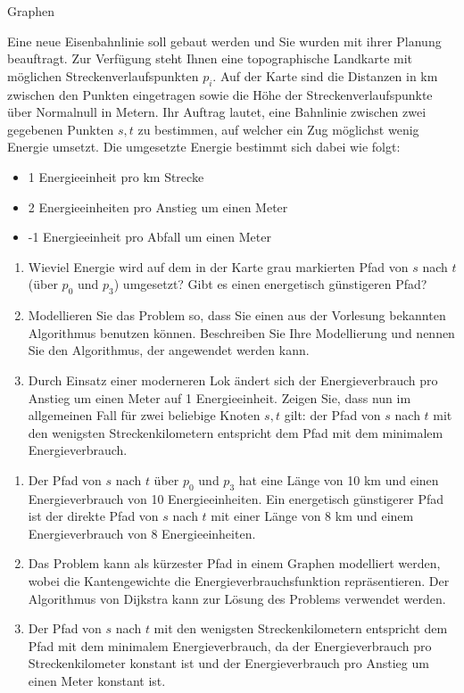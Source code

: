 \documentclass{article}
\begin{document}
\begin{exercise}{Graphen}
  
  Eine neue Eisenbahnlinie soll gebaut werden und Sie wurden mit ihrer Planung beauftragt. Zur Verfügung steht Ihnen eine topographische Landkarte mit möglichen Streckenverlaufspunkten $p_i$. Auf der Karte sind die Distanzen in km zwischen den Punkten eingetragen sowie die Höhe der Streckenverlaufspunkte über Normalnull in Metern. Ihr Auftrag lautet, eine Bahnlinie zwischen zwei gegebenen Punkten $s, t$ zu bestimmen, auf welcher ein Zug möglichst wenig Energie umsetzt. Die umgesetzte Energie bestimmt sich dabei wie folgt:
  \begin{itemize}
    \item 1 Energieeinheit pro km Strecke
    \item 2 Energieeinheiten pro Anstieg um einen Meter
    \item -1 Energieeinheit pro Abfall um einen Meter
  \end{itemize}
  \begin{enumerate}
    \item Wieviel Energie wird auf dem in der Karte grau markierten Pfad von $s$ nach $t$ (über $p_0$ und $p_3$) umgesetzt? Gibt es einen energetisch günstigeren Pfad?
    \item Modellieren Sie das Problem so, dass Sie einen aus der Vorlesung bekannten Algorithmus benutzen können. Beschreiben Sie Ihre Modellierung und nennen Sie den Algorithmus, der angewendet werden kann.
    \item Durch Einsatz einer moderneren Lok ändert sich der Energieverbrauch pro Anstieg um einen Meter auf 1 Energieeinheit. Zeigen Sie, dass nun im allgemeinen Fall für zwei beliebige Knoten $s, t$ gilt: der Pfad von $s$ nach $t$ mit den wenigsten Streckenkilometern entspricht dem Pfad mit dem minimalem Energieverbrauch.
  \end{enumerate}

  \begin{solution}
    \begin{enumerate}
      \item Der Pfad von $s$ nach $t$ über $p_0$ und $p_3$ hat eine Länge von 10 km und einen Energieverbrauch von 10 Energieeinheiten. Ein energetisch günstigerer Pfad ist der direkte Pfad von $s$ nach $t$ mit einer Länge von 8 km und einem Energieverbrauch von 8 Energieeinheiten.
      \item Das Problem kann als kürzester Pfad in einem Graphen modelliert werden, wobei die Kantengewichte die Energieverbrauchsfunktion repräsentieren. Der Algorithmus von Dijkstra kann zur Lösung des Problems verwendet werden.
      \item Der Pfad von $s$ nach $t$ mit den wenigsten Streckenkilometern entspricht dem Pfad mit dem minimalem Energieverbrauch, da der Energieverbrauch pro Streckenkilometer konstant ist und der Energieverbrauch pro Anstieg um einen Meter konstant ist.
    \end{enumerate}
  \end{solution}
\end{exercise}
\end{document}

